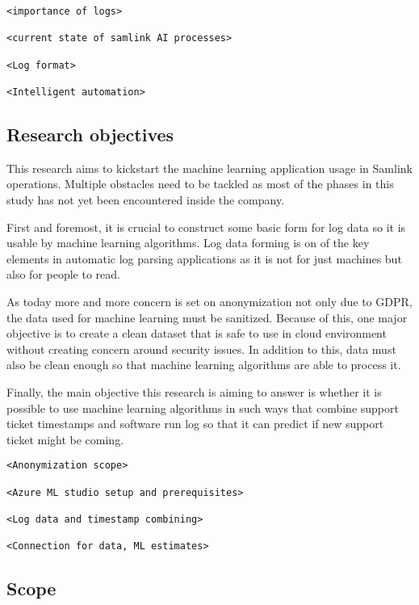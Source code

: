 \documentclass[english, 12pt, a4paper, elec, utf8, a-1b, online]{aaltothesis}
\begin{document}
\begin{verbatim}
<importance of logs>

<current state of samlink AI processes>

<Log format>

<Intelligent automation>
\end{verbatim}

\subsection{Research objectives}\label{subsec:research-objectives}
This research aims to kickstart the machine learning application usage in Samlink operations.
Multiple obstacles need to be tackled
as most of the phases in this study has not yet been encountered inside the company.

First and foremost,
it is crucial to construct some basic form for log data
so it is usable by machine learning algorithms.
Log data forming is on of the key elements in automatic log parsing applications
as it is not for just machines
but also for people to read.

As today more and more concern is set on anonymization
not only due to GDPR,
the data used for machine learning must be sanitized.
Because of this,
one major objective is to create a clean dataset
that is safe to use in cloud environment
without creating concern around security issues.
In addition to this,
data must also be clean enough
so that machine learning algorithms
are able to process it.

Finally,
the main objective this research is aiming to answer
is whether it is possible to use machine learning algorithms
in such ways that combine support ticket timestamps
and software run log
so that it can predict
if new support ticket might be coming.

\begin{verbatim}
<Anonymization scope>

<Azure ML studio setup and prerequisites>

<Log data and timestamp combining>

<Connection for data, ML estimates>

\end{verbatim}

\subsection{Scope}\label{subsec:scope}
\end{document}
